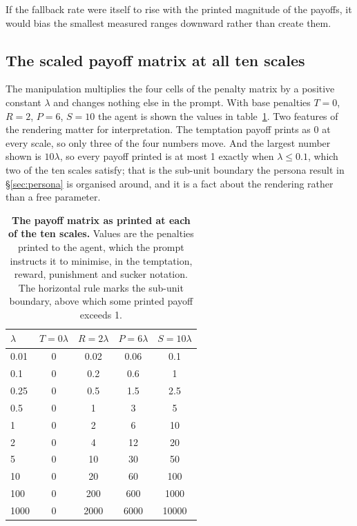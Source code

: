 \documentclass[openacc]{rsproca_new}
\newcommand{\lam}{\lambda}
\begin{document}
If the fallback rate were itself to rise with the printed magnitude of
the payoffs, it would bias the smallest measured ranges downward rather than
create them.

\subsection{The scaled payoff matrix at all ten scales}\label{appendix:payoff_scaling}

The manipulation multiplies the four cells of the penalty matrix by a positive
constant $\lam$ and changes nothing else in the prompt. With base penalties
$T = 0$, $R = 2$, $P = 6$, $S = 10$ the agent is shown the values in
table~\ref{tab:A-lambdas}. Two features of the rendering matter for
interpretation. The temptation payoff prints as 0 at every scale, so only three
of the four numbers move. And the largest number shown is $10\lam$, so every
payoff printed is at most 1 exactly when $\lam \leq 0.1$, which two of the ten
scales satisfy; that is the sub-unit boundary the persona result in
\S\ref{sec:persona} is organised around, and it is a fact about the rendering
rather than a free parameter.

\begin{table}[htbp]
\centering
\footnotesize
\caption{\textbf{The payoff matrix as printed at each of the ten scales.}
Values are the penalties printed to the agent, which the prompt instructs it
to minimise, in the temptation, reward,
punishment and sucker notation. The horizontal rule marks the sub-unit
boundary, above which some printed payoff exceeds 1.}
\label{tab:A-lambdas}
\begin{tabular}{@{}lcccc@{}}
\toprule
$\lam$ & $T = 0\lam$ & $R = 2\lam$ & $P = 6\lam$ & $S = 10\lam$ \\
\midrule
0.01   & 0 & 0.02 & 0.06 & 0.1 \\
0.1    & 0 & 0.2  & 0.6  & 1 \\
\midrule
0.25   & 0 & 0.5  & 1.5  & 2.5 \\
0.5    & 0 & 1    & 3    & 5 \\
1      & 0 & 2    & 6    & 10 \\
2      & 0 & 4    & 12   & 20 \\
5      & 0 & 10   & 30   & 50 \\
10     & 0 & 20   & 60   & 100 \\
100    & 0 & 200  & 600  & 1000 \\
1000   & 0 & 2000 & 6000 & 10000 \\
\bottomrule
\end{tabular}
\end{table}
\end{document}

